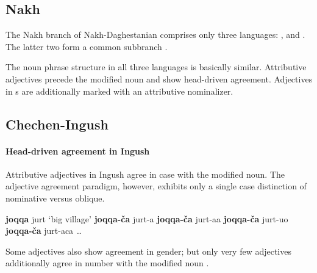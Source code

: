 \subsection{Nakh}
The Nakh branch of Nakh-Daghestanian comprises only three languages: ,  and . The latter two form a common subbranch \citep[220, 233]{salminen2007}.

The noun phrase structure in all three languages is basically similar. Attributive adjectives precede the modified noun and show head\hyp{}driven agreement. Adjectives in s are additionally marked with an attributive nominalizer.

\subsection{Chechen-Ingush}
\label{ingush synchr}
\paragraph*{Head\hyp{}driven agreement in Ingush}
Attributive adjectives in Ingush agree in case with the modified noun. The adjective agreement paradigm, however, exhibits only a single case distinction of nominative versus oblique.
\begin{exe}
\settowidth{}
\label{ingush agr}
\begin{xlist}
\ex \textbf{joqqa} jurt			{\rm ‘big village’}	
\ex \textbf{joqqa-ča} jurt-a						
\ex \textbf{joqqa-ča} jurt-aa					
\ex \textbf{joqqa-ča} jurt-uo					
\ex \textbf{joqqa-ča} jurt-aca					
\ex \dots
\end{xlist}
\end{exe}
Some adjectives also show agreement in gender; but only very few adjectives additionally agree in number with the modified noun \citep[99]{nichols1994b}.

